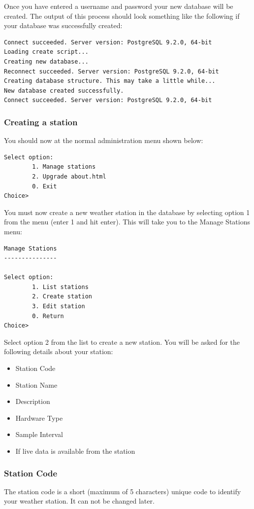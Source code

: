 \documentclass[a4paper,10pt,draft]{book}
\begin{document}
Once you have entered a username and password your new database will be created. The output of this process should look something like the following if your database was successfully created:
\begin{verbatim}
Connect succeeded. Server version: PostgreSQL 9.2.0, 64-bit
Loading create script...
Creating new database...
Reconnect succeeded. Server version: PostgreSQL 9.2.0, 64-bit
Creating database structure. This may take a little while...
New database created successfully.
Connect succeeded. Server version: PostgreSQL 9.2.0, 64-bit
\end{verbatim}

\subsubsection{Creating a station}

You should now at the normal administration menu shown below:
\begin{verbatim}
Select option:
        1. Manage stations
        2. Upgrade about.html
        0. Exit
Choice>
\end{verbatim}

You must now create a new weather station in the database by selecting option 1 from the menu (enter 1 and hit enter). This will take you to the Manage Stations menu:

\begin{verbatim}
Manage Stations
---------------

Select option:
        1. List stations
        2. Create station
        3. Edit station
        0. Return
Choice>
\end{verbatim}

Select option 2 from the list to create a new station. You will be asked for the following details about your station:
\begin{itemize}
\item Station Code
\item Station Name
\item Description
\item Hardware Type
\item Sample Interval
\item If live data is available from the station
\end{itemize}

\subsubsection{Station Code}
The station code is a short (maximum of 5 characters) unique code to identify your weather station. It can not be changed later.
\end{document}
